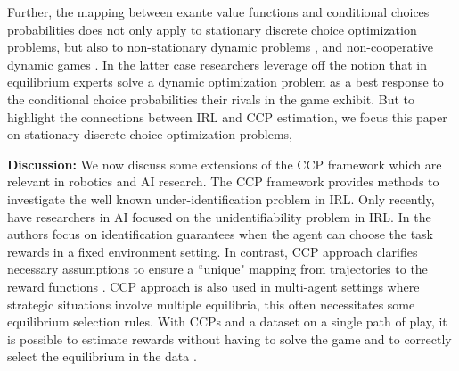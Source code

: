 \documentclass{article}
\begin{document}
Further, the mapping between exante value functions and conditional choices probabilities does not only apply to stationary discrete choice optimization problems, but also to non-stationary dynamic problems \cite{arcidiacono2014nonstationary}, and non-cooperative dynamic games \cite{bajari}. In the latter case researchers leverage off the notion that in equilibrium experts solve a dynamic optimization problem as a best response to the conditional choice probabilities their rivals in the game exhibit. But to highlight the connections between IRL and CCP estimation, we focus this paper on stationary discrete choice optimization problems,



\textbf{Discussion:} 
We now discuss some extensions of the CCP framework which are relevant in robotics and AI research.  
The CCP framework provides methods to investigate the well known under-identification problem in IRL. Only recently, have researchers in AI focused on the unidentifiability problem in IRL. In \cite{amin2017repeated} the authors focus on identification guarantees when the agent can choose the task rewards in a fixed environment setting. In contrast, CCP approach clarifies necessary assumptions to ensure a ``unique" mapping from trajectories to the reward functions \cite{magnac}. CCP approach is also used in multi-agent settings where strategic situations involve multiple equilibria, this often necessitates some equilibrium selection rules. With CCPs and a dataset on a single path of play, it is possible to estimate rewards without having to solve the game and to correctly select the equilibrium in the data \cite{pese}.


\end{document}
